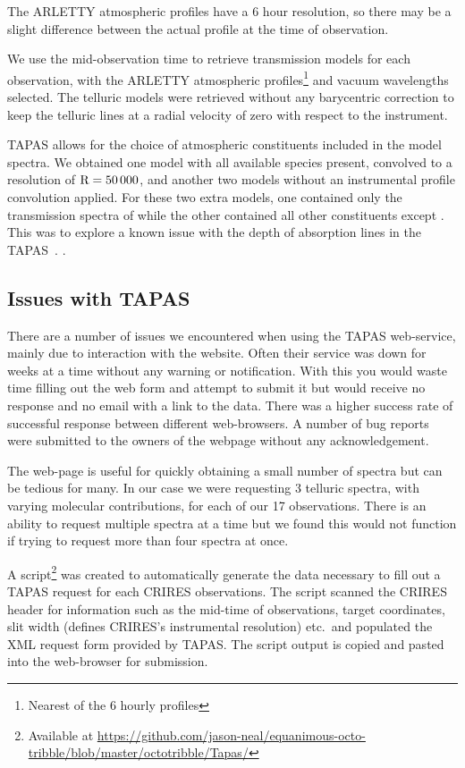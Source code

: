 The {ARLETTY} atmospheric profiles have a 6 hour resolution, so there may be a slight difference between the actual profile at the time of observation.

We use the mid-observation time to retrieve transmission models for each observation, with the {ARLETTY} atmospheric profiles\footnote{Nearest of the 6 hourly profiles} and vacuum wavelengths selected.
The telluric models were retrieved without any barycentric correction to keep the telluric lines at a radial velocity of zero with respect to the instrument.

{TAPAS} allows for the choice of atmospheric constituents included in the model spectra.
We obtained one model with all available species present, convolved to a resolution of \(\rm R=50\,000\), and another two models without an instrumental profile convolution applied.
For these two extra models, one contained only the transmission spectra of  while the other contained all other constituents except .
This was to explore a known issue with the depth of  absorption lines in the {TAPAS}~\citet{bertaux_tapas_2014}. .


\subsection{Issues with {TAPAS}}
There are a number of issues we encountered when using the {TAPAS} web-service, mainly due to interaction with the website.
Often their service was down for weeks at a time without any warning or notification.
With this you would waste time filling out the web form and attempt to submit it but would receive no response and no email with a link to the data.
There was a higher success rate of successful response between different web-browsers.
A number of bug reports were submitted to the owners of the webpage without any acknowledgement.

The web-page is useful for quickly obtaining a small number of spectra but can be tedious for many.
In our case we were requesting 3 telluric spectra, with varying molecular contributions, for each of our 17 observations.
There is an ability to request multiple spectra at a time but we found this would not function if trying to request more than four spectra at once.

A script\footnote{Available at \href{https://github.com/jason-neal/equanimous-octo-tribble/blob/master/octotribble/Tapas/}{https://github.com/jason-neal/equanimous-octo-tribble/blob/master/octotribble/Tapas/}} was created to automatically generate the data necessary to fill out a {TAPAS} request for each {CRIRES} observations.
The script scanned the {CRIRES} header for information such as the mid-time of observations, target coordinates, slit width (defines {CRIRES}'s instrumental resolution) etc.\ and populated the {XML} request form provided by {TAPAS}.
The script output is copied and pasted into the web-browser for submission.

